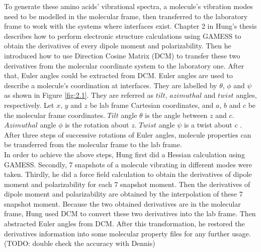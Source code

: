 To generate these amino acids' vibrational spectra, a molecule's vibration modes need to be modelled in the molecular frame, then transferred to the laboratory frame to work with the systems where interfaces exist. Chapter 2 in Hung's thesis \cite{KuoKaiHung:Thesis:2015} describes how to perform electronic structure calculations using GAMESS \cite{GAMESS} to obtain the derivatives of every dipole moment and polarizability. Then he introduced how to use Direction Cosine Matrix (DCM) to transfer these two derivatives from the molecular coordinate system to the laboratory one. After that, Euler angles could be extracted from DCM. Euler angles are used to describe a molecule's coordination at interfaces. They are labelled by $\theta$, $\phi$ and $\psi$ as shown in Figure \ref{fig:2.1}. They are referred as $tilt$, $azimuthal$ and $twist$ angles, respectively. Let $x$, $y$ and $z$ be lab frame Cartesian coordinates, and $a$, $b$ and $c$ be the molecular frame coordinates. $Tilt$ angle $\theta$ is the angle between $z$ and $c$. $Azimuthal$ angle $\phi$ is the rotation about $z$. $Twist$ angle $\psi$ is a twist about $c$ \cite{hore0033-rotations}. After three steps of successive rotations of Euler angles, molecule properties can be transferred from the molecular frame to the lab frame. \\

In order to achieve the above steps, Hung first did a Hessian calculation using GAMESS. Secondly, 7 snapshots of a molecule vibrating in different modes were taken. Thirdly, he did a force field calculation to obtain the derivatives of dipole moment and polarizability for each 7 snapshot moment. Then the derivatives of dipole moment and polarizability are obtained by the interpolation of these 7 snapshot moment. Because the two obtained derivatives are in the molecular frame, Hung used DCM to convert these two derivatives into the lab frame. Then abstracted Euler angles from DCM. After this transformation, he restored the derivatives information into some molecular property files for any further usage. (TODO: double check the accuracy with Dennis)\\

